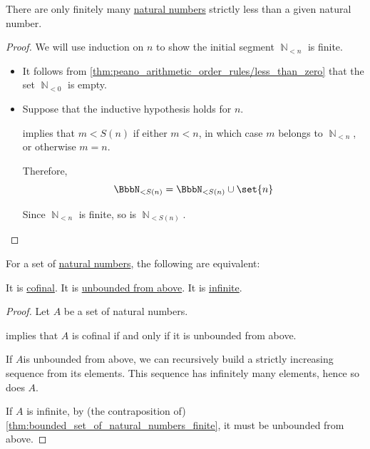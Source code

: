 \begin{lemma}\label{thm:bounded_set_of_natural_numbers_finite}
  There are only finitely many \hyperref[def:natural_numbers]{natural numbers} strictly less than a given natural number.
\end{lemma}
\begin{proof}
  We will use induction on \( n \) to show the initial segment \( \BbbN_{<n} \) is finite.
  \begin{itemize}
    \item It follows from \cref{thm:peano_arithmetic_order_rules/less_than_zero} that the set \( \BbbN_{<0} \) is empty.
    \item Suppose that the inductive hypothesis holds for \( n \).

     implies that \( m < S(n) \) if either \( m < n \), in which case \( m \) belongs to \( \BbbN_{<n} \), or otherwise \( m = n \).

    Therefore,
    \begin{equation*}
      \BbbN_{<S(n)} = \BbbN_{<S(n)} \cup \set{ n }
    \end{equation*}

    Since \( \BbbN_{<n} \) is finite, so is \( \BbbN_{<S(n)} \).
  \end{itemize}
\end{proof}

\begin{proposition}\label{thm:natural_numbers_confinal_equivalence}
  For a set of \hyperref[def:natural_numbers]{natural numbers}, the following are equivalent:
  \begin{thmenum}
     It is \hyperref[def:cofinal_set]{cofinal}.
     It is \hyperref[def:extremal_points/bounds]{unbounded from above}.
     It is \hyperref[def:aleph_zero_related_cardinalities]{infinite}.
  \end{thmenum}
\end{proposition}
\begin{proof}
  Let \( A \) be a set of natural numbers.

    implies that \( A \) is cofinal if and only if it is unbounded from above.

   If \( A \)is unbounded from above, we can recursively build a strictly increasing sequence from its elements. This sequence has infinitely many elements, hence so does \( A \).

   If \( A \) is infinite, by (the contraposition of) \cref{thm:bounded_set_of_natural_numbers_finite}, it must be unbounded from above.
\end{proof}
